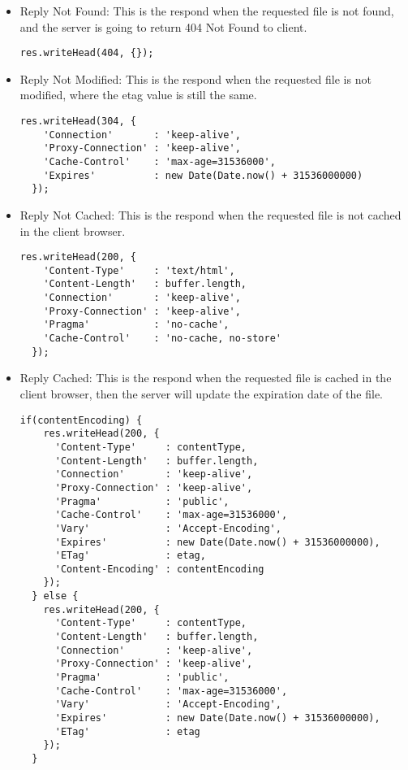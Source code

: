 \begin{itemize}
\item Reply Not Found: This is the respond when the requested file is not found, and the server is going to return 404 Not Found to client.  

\begin{lstlisting}
res.writeHead(404, {});
\end{lstlisting}

\item Reply Not Modified: This is the respond when the requested file is not modified, where the etag value is still the same. 

\begin{lstlisting}
res.writeHead(304, {
    'Connection'       : 'keep-alive',
    'Proxy-Connection' : 'keep-alive',
    'Cache-Control'    : 'max-age=31536000',
    'Expires'          : new Date(Date.now() + 31536000000)
  });
\end{lstlisting}

\item Reply Not Cached: This is the respond when the requested file is not cached in the client browser. 

\begin{lstlisting}
res.writeHead(200, {
    'Content-Type'     : 'text/html',
    'Content-Length'   : buffer.length,
    'Connection'       : 'keep-alive',
    'Proxy-Connection' : 'keep-alive',
    'Pragma'           : 'no-cache',
    'Cache-Control'    : 'no-cache, no-store'
  });
\end{lstlisting}

\item Reply Cached: This is the respond when the requested file is cached in the client browser, then the server will update the expiration date of the file.

\begin{lstlisting}
if(contentEncoding) {
    res.writeHead(200, {
      'Content-Type'     : contentType,
      'Content-Length'   : buffer.length,
      'Connection'       : 'keep-alive',
      'Proxy-Connection' : 'keep-alive',
      'Pragma'           : 'public',
      'Cache-Control'    : 'max-age=31536000',
      'Vary'             : 'Accept-Encoding',
      'Expires'          : new Date(Date.now() + 31536000000),
      'ETag'             : etag,
      'Content-Encoding' : contentEncoding
    });
  } else {
    res.writeHead(200, {
      'Content-Type'     : contentType,
      'Content-Length'   : buffer.length,
      'Connection'       : 'keep-alive',
      'Proxy-Connection' : 'keep-alive',
      'Pragma'           : 'public',
      'Cache-Control'    : 'max-age=31536000',
      'Vary'             : 'Accept-Encoding',
      'Expires'          : new Date(Date.now() + 31536000000),
      'ETag'             : etag
    });
  }\end{lstlisting}

\end{itemize}


